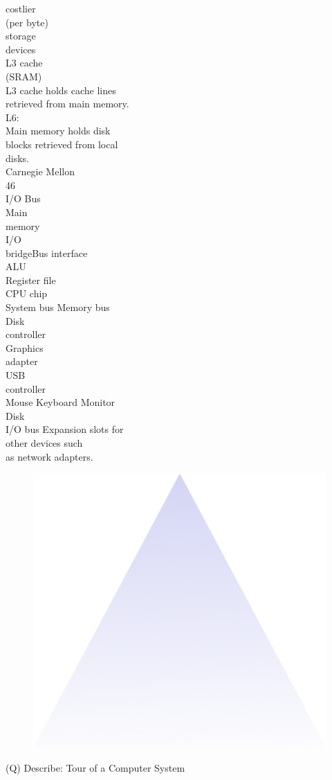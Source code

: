 \documentclass[12pt]{article}
\begin{document}
costlier\\
(per byte)\\
storage \\
devices\\
L3 cache \\
(SRAM)\\
L3 cache holds cache lines\\
retrieved from main memory.\\
L6:\\
Main memory holds disk \\
blocks retrieved from local \\
disks.\\
Carnegie Mellon\\
46\\
I/O Bus\\
Main\\
memory\\
I/O \\
bridgeBus interface\\
ALU\\
Register file\\
CPU chip\\
System bus Memory bus\\
Disk \\
controller\\
Graphics\\
adapter\\
USB\\
controller\\
Mouse Keyboard Monitor\\
Disk\\
I/O bus Expansion slots for\\
other devices such\\
as network adapters.\\
\begin{figure}[H]
\includegraphics[width=0.5\linewidth]{page4-image-1.png}
\end{figure}
\clearpage
(Q)
Describe: Tour of a Computer System
\clearpage
\end{document}
